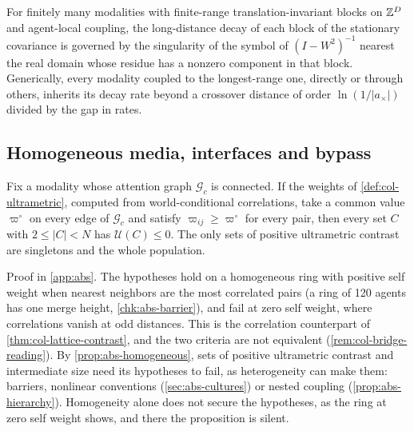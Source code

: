 \begin{conjecture}\label{conj:abs-multiplex}
For finitely many modalities with finite-range translation-invariant blocks on $\mathbb{Z}^D$ and agent-local coupling, the long-distance decay of each block of the stationary covariance is governed by the singularity of the symbol of $(I-W^2)^{-1}$ nearest the real domain whose residue has a nonzero component in that block. Generically, every modality coupled to the longest-range one, directly or through others, inherits its decay rate beyond a crossover distance of order $\ln(1/\lvert a_\times\rvert)$ divided by the gap in rates.
\end{conjecture}

\subsection{Homogeneous media, interfaces and bypass}\label{sup:abs-homogeneous-media-interfaces-and-bypass}

\begin{proposition}\label{prop:abs-homogeneous}
Fix a modality whose attention graph $\mathcal G_c$ is connected. If the weights of \cref{def:col-ultrametric}, computed from world-conditional correlations, take a common value $\varpi^\circ$ on every edge of $\mathcal G_c$ and satisfy $\varpi_{ij}\ge\varpi^\circ$ for every pair, then every set $C$ with $2\le\lvert C\rvert<N$ has $\mathcal U(C)\le0$. The only sets of positive ultrametric contrast are singletons and the whole population.
\end{proposition}

Proof in \cref{app:abs}. The hypotheses hold on a homogeneous ring with positive self weight when nearest neighbors are the most correlated pairs (a ring of 120 agents has one merge height, \cref{chk:abs-barrier}), and fail at zero self weight, where correlations vanish at odd distances. This is the correlation counterpart of \cref{thm:col-lattice-contrast}, and the two criteria are not equivalent (\cref{rem:col-bridge-reading}). By \cref{prop:abs-homogeneous}, sets of positive ultrametric contrast and intermediate size need its hypotheses to fail, as heterogeneity can make them: barriers, nonlinear conventions (\cref{sec:abs-cultures}) or nested coupling (\cref{prop:abs-hierarchy}). Homogeneity alone does not secure the hypotheses, as the ring at zero self weight shows, and there the proposition is silent.

